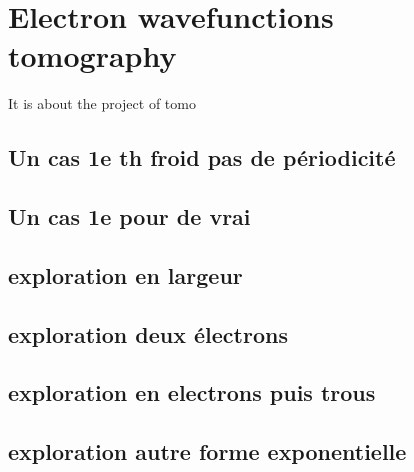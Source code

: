 \chapter{Electron wavefunctions tomography}

It is about the project of tomo

\section{\texorpdfstring{Un cas 1e th froid pas de périodicité}{}}

\section{\texorpdfstring{Un cas 1e pour de vrai}{}}

\section{\texorpdfstring{exploration en largeur}{}}

\section{\texorpdfstring{exploration deux électrons}{}}

\section{\texorpdfstring{exploration en electrons puis trous}{}}

\section{\texorpdfstring{exploration autre forme exponentielle}{}}

